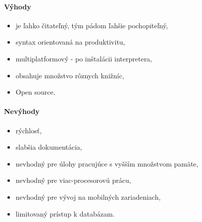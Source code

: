 \paragraph{Výhody}
\begin{itemize}
	\item je ľahko čitateľný, tým pádom ľahšie pochopiteľný,
	\item syntax orientovaná na produktivitu,
	\item multiplatformový - po inštalácii interpretera,
	\item obsahuje množstvo rôznych knižníc,
	\item Open source.
	\newline
\end{itemize}
\paragraph{Nevýhody}
\begin{itemize}
	\item rýchlosť,
	\item slabšia dokumentácia,
	\item nevhodný pre úlohy pracujúce s vyšším množstvom pamäte,
	\item nevhodný pre viac-procesorovú prácu,
	\item nevhodný pre vývoj na mobilných zariadeniach,
	\item limitovaný prístup k databázam.
	\newline
\end{itemize}

